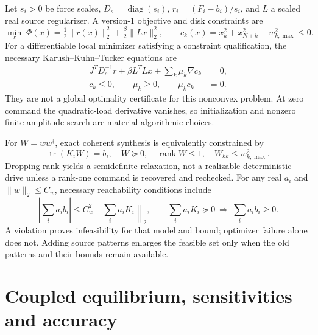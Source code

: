 Let $s_i>0$ be force scales, $D_s=\operatorname{diag}(s_i)$,
$r_i=(F_i-b_i)/s_i$, and $L$ a scaled real source regularizer. A version-1
objective and disk constraints are
\begin{equation}\label{eq:source-objective}
 \min_x\;\Phi(x)=\tfrac12\|r(x)\|_2^2+\tfrac\beta2\|Lx\|_2^2,
 \qquad c_k(x)=x_k^2+x_{N+k}^2-w_{k,\max}^2\le0.
\end{equation}
For a differentiable local minimizer satisfying a constraint qualification,
the necessary Karush--Kuhn--Tucker equations are
\begin{align}
 J^TD_s^{-1}r+\beta L^TLx+\sum_k\mu_k\nabla c_k&=0,\label{eq:kkt}\\
 c_k\le0,\qquad\mu_k\ge0,\qquad\mu_kc_k&=0.
\end{align}
They are not a global optimality certificate for this nonconvex problem.
At zero command the quadratic-load derivative vanishes, so initialization
and nonzero finite-amplitude search are material algorithmic choices.

For $W=ww^\dagger$, exact coherent synthesis is equivalently constrained by
\begin{equation}\label{eq:rank-one}
 \operatorname{tr}(K_iW)=b_i,\quad W\succeq0,\quad
 \operatorname{rank}W\le1,\quad W_{kk}\le w_{k,\max}^2.
\end{equation}
Dropping rank yields a semidefinite relaxation, not a realizable deterministic
drive unless a rank-one command is recovered and rechecked. For any real
$a_i$ and $\|w\|_2\le C_w$, necessary reachability conditions include
\begin{equation}\label{eq:obstruction}
 \left|\sum_i a_ib_i\right|\le C_w^2\left\|\sum_i a_iK_i\right\|_2,
 \qquad \sum_i a_iK_i\succeq0\ \Longrightarrow\ \sum_i a_ib_i\ge0.
\end{equation}
A violation proves infeasibility for that model and bound; optimizer failure
alone does not. Adding source patterns enlarges the feasible set only when
the old patterns and their bounds remain available.

\section{Coupled equilibrium, sensitivities and accuracy}

